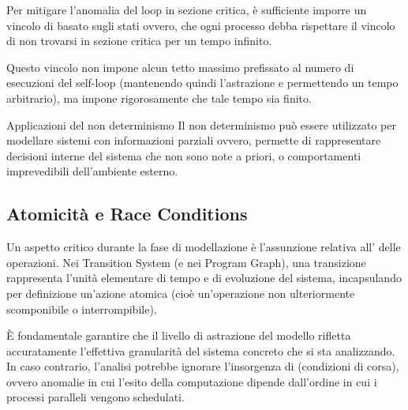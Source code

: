 Per mitigare l'anomalia del loop in sezione critica, è sufficiente imporre un vincolo di  basato sugli stati ovvero, che ogni processo debba rispettare il vincolo di non trovarsi in sezione critica per un tempo infinito.

Questo vincolo non impone alcun tetto massimo prefissato al numero di esecuzioni del self-loop (mantenendo quindi l'astrazione e permettendo un tempo arbitrario), ma impone rigorosamente che tale tempo sia finito.

\begin{note}{Applicazioni del non determinismo}
  Il non determinismo può essere utilizzato per modellare sistemi con informazioni parziali ovvero, permette di rappresentare decisioni interne del sistema che non sono note a priori, o comportamenti imprevedibili dell'ambiente esterno.
\end{note}

\subsection{Atomicità e Race Conditions}

Un aspetto critico durante la fase di modellazione è l'assunzione relativa all' delle operazioni. Nei Transition System (e nei Program Graph), una transizione rappresenta l'unità elementare di tempo e di evoluzione del sistema, incapsulando per definizione un'azione atomica (cioè un'operazione non ulteriormente scomponibile o interrompibile).

È fondamentale garantire che il livello di astrazione del modello rifletta accuratamente l'effettiva granularità del sistema concreto che si sta analizzando. In caso contrario, l'analisi potrebbe ignorare l'insorgenza di  (condizioni di corsa), ovvero anomalie in cui l'esito della computazione dipende dall'ordine in cui i processi paralleli vengono schedulati.

